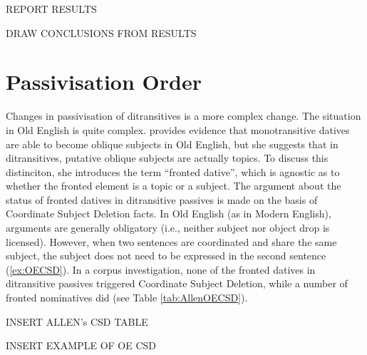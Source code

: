 REPORT RESULTS

DRAW CONCLUSIONS FROM RESULTS

\section{Passivisation Order}
	Changes in passivisation of ditransitives is a more complex change. The situation in Old English is quite complex. \cite{Allen.1999} provides evidence that monotransitive datives are able to become oblique subjects in Old English, but she suggests that in ditransitives, putative oblique subjects are actually topics. To discuss this distinciton, she introduces the term ``fronted dative'', which is agnostic as to whether the fronted element is a topic or a subject. The argument about the status of fronted datives in ditransitive passives is made on the basis of Coordinate Subject Deletion facts.
	In Old English (as in Modern English), arguments are generally obligatory (i.e., neither subject nor object drop is licensed). However, when two sentences are coordinated and share the same subject, the subject does not need to be expressed in the second sentence (\ref{ex:OECSD}). In a corpus investigation, none of the fronted datives in ditransitive passives triggered Coordinate Subject Deletion, while a number of fronted nominatives did (see Table \ref{tab:AllenOECSD}). 

	\begin{table}
		INSERT ALLEN's CSD TABLE
		\label{tab:AllenOECSD}
	\end{table}

	\begin{exe}
		\ex \label{ex:OECSD} INSERT EXAMPLE OF OE CSD
	\end{exe}

